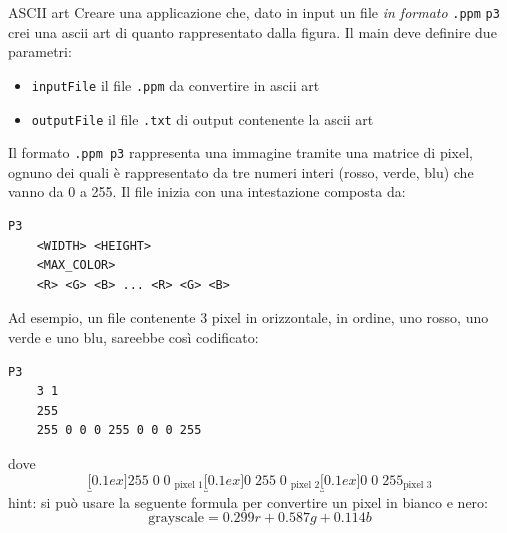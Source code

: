\begin{esercizio}{ASCII art}
	Creare una applicazione che, dato in input un file \textit{in formato} \verb|.ppm| \verb|p3| crei una ascii art di quanto rappresentato dalla figura. Il main deve definire due parametri:
	\begin{itemize}
		\item \verb|inputFile| il file \verb|.ppm| da convertire in ascii art
		\item \verb|outputFile| il file \verb|.txt| di output contenente la ascii art
	\end{itemize}
	Il formato \verb|.ppm p3| rappresenta una immagine tramite una matrice di pixel, ognuno dei quali è rappresentato da tre numeri interi (rosso, verde, blu) che vanno da 0 a 255. Il file inizia con una intestazione composta da:
	\begin{lstlisting}[frame = none]
    P3
    <WIDTH> <HEIGHT>
    <MAX_COLOR>
    <R> <G> <B> ... <R> <G> <B>
  \end{lstlisting}
	Ad esempio, un file contenente 3 pixel in orizzontale, in ordine, uno rosso, uno verde e uno blu, sareebbe così codificato:
	\begin{lstlisting}[frame = none]
    P3
    3 1
    255
    255 0 0 0 255 0 0 0 255
  \end{lstlisting}
	dove
	\[
		\underbracket[0.1ex]{255\; 0\; 0\;}_{\text{pixel 1}} \underbracket[0.1ex]{0\; 255\; 0\;}_{\text{pixel 2}} \underbracket[0.1ex]{0\; 0\; 255}_{\text{pixel 3}}
	\]
	hint: si può usare la seguente formula per convertire un pixel in bianco e nero:
	\[
		\text{grayscale} = 0.299  r + 0.587   g + 0.114   b
	\]
\end{esercizio}

